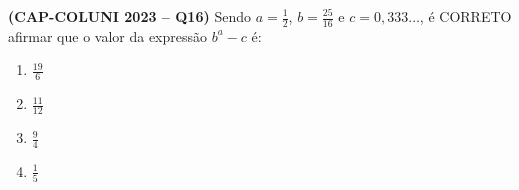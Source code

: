 \textbf{(CAP-COLUNI 2023 -- Q16)} Sendo $a=\frac12$, $b=\frac{25}{16}$ e $c=0{,}333\ldots$, é CORRETO afirmar que o valor da expressão $b^a-c$ é:

\begin{enumerate}
	\item $\frac{19}{6}$
	\item $\frac{11}{12}$
	\item $\frac94$
	\item $\frac15$
\end{enumerate}

